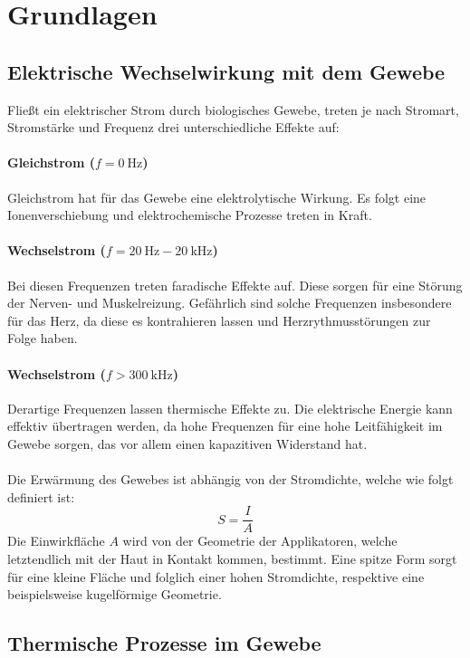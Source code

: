 \documentclass[letterpaper,12pt]{article}
\begin{document}
	
	\newpage
	\section{Grundlagen}
	
		\subsection{Elektrische Wechselwirkung mit dem Gewebe}
	
			Fließt ein elektrischer Strom durch biologisches Gewebe, treten je nach Stromart, Stromstärke und Frequenz drei unterschiedliche Effekte auf:
			\paragraph{Gleichstrom ($f=\SI{0}{\hertz}$)}
			Gleichstrom hat für das Gewebe eine elektrolytische Wirkung. Es folgt eine Ionenverschiebung und elektrochemische Prozesse treten in Kraft. 
			\paragraph{Wechselstrom ($f=\SI{20}{\hertz}-\SI{20}{\kilo\hertz}$)}
			Bei diesen Frequenzen treten faradische Effekte auf. Diese sorgen für eine Störung der Nerven- und Muskelreizung. Gefährlich sind solche Frequenzen insbesondere für das Herz, da diese es kontrahieren lassen und Herzrythmusstörungen zur Folge haben.
			\paragraph{Wechselstrom ($f>\SI{300}{\kilo\hertz}$)}
			Derartige Frequenzen lassen thermische Effekte zu. Die elektrische Energie kann effektiv übertragen werden, da hohe Frequenzen für eine hohe Leitfähigkeit im Gewebe sorgen, das vor allem einen kapazitiven Widerstand hat.\\\\	
			Die Erwärmung des Gewebes ist abhängig von der Stromdichte, welche wie folgt definiert ist:
			\begin{equation} \label{eq:stromdichte}
				S=\frac{I}{A}
			\end{equation}
			Die Einwirkfläche $A$ wird von der Geometrie der Applikatoren, welche letztendlich mit der Haut in Kontakt kommen, bestimmt. Eine spitze Form sorgt für eine kleine Fläche und folglich einer hohen Stromdichte, respektive eine beispielsweise kugelförmige Geometrie.  
		\subsection{Thermische Prozesse im Gewebe}
		
\end{document}
